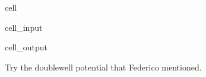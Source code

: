 \documentclass[letterpaper,10pt,english]{jupyterBook}
\begin{document}
\begin{sphinxuseclass}{cell}\begin{sphinxVerbatimInput}

\begin{sphinxuseclass}{cell_input}
\begin{sphinxVerbatim}[commandchars=\\\{\}]
      
   
    \PYG{p}{[}\PYG{p}{]}\PYG{p}{[}\PYG{p}{]}
\end{sphinxVerbatim}

\end{sphinxuseclass}\end{sphinxVerbatimInput}
\begin{sphinxVerbatimOutput}

\begin{sphinxuseclass}{cell_output}
\noindent{}

\end{sphinxuseclass}\end{sphinxVerbatimOutput}

\end{sphinxuseclass}
\sphinxAtStartPar
Try the double\sphinxhyphen{}well potential that Federico mentioned.
\end{document}
